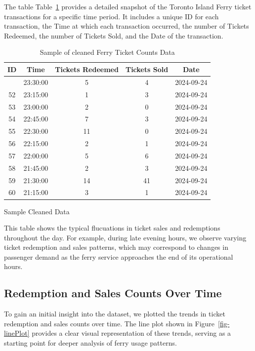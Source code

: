 \documentclass[
  letterpaper,
  DIV=11,
  numbers=noendperiod]{scrartcl}
\begin{document}
The table Table~\ref{tbl-cleaned_data} provides a detailed snapshot of
the Toronto Island Ferry ticket transactions for a specific time period.
It includes a unique ID for each transaction, the Time at which each
transaction occurred, the number of Tickets Redeemed, the number of
Tickets Sold, and the Date of the transaction.

\begin{longtable}[]{@{}ccccc@{}}

\caption{\label{tbl-cleaned_data}Sample of cleaned Ferry Ticket Counts
Data}

\tabularnewline

\toprule\noalign{}
ID & Time & Tickets Redeemed & Tickets Sold & Date \\
\midrule\noalign{}
\endhead
\bottomrule\noalign{}
\endlastfoot
51 & 23:30:00 & 5 & 4 & 2024-09-24 \\
52 & 23:15:00 & 1 & 3 & 2024-09-24 \\
53 & 23:00:00 & 2 & 0 & 2024-09-24 \\
54 & 22:45:00 & 7 & 3 & 2024-09-24 \\
55 & 22:30:00 & 11 & 0 & 2024-09-24 \\
56 & 22:15:00 & 2 & 1 & 2024-09-24 \\
57 & 22:00:00 & 5 & 6 & 2024-09-24 \\
58 & 21:45:00 & 2 & 3 & 2024-09-24 \\
59 & 21:30:00 & 14 & 41 & 2024-09-24 \\
60 & 21:15:00 & 3 & 1 & 2024-09-24 \\

\end{longtable}

Sample Cleaned Data

This table shows the typical flucuations in ticket sales and redemptions
throughout the day. For example, during late evening hours, we observe
varying ticket redemption and sales patterns, which may correspond to
changes in passenger demand as the ferry service approaches the end of
its operational hours.

\subsection{Redemption and Sales Counts Over
Time}\label{redemption-and-sales-counts-over-time}

To gain an initial insight into the dataset, we plotted the trends in
ticket redemption and sales counts over time. The line plot shown in
Figure~\ref{fig-linePlot} provides a clear visual representation of
these trends, serving as a starting point for deeper analysis of ferry
usage patterns.
\end{document}
